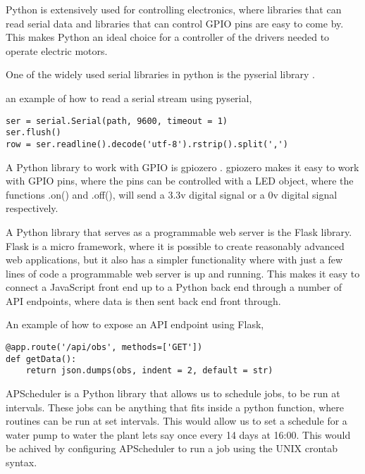 \documentclass[a4paper,12pt,twoside,openright,titlepage]{book}
\begin{document}
Python is extensively used for controlling electronics, where libraries that can read serial data and libraries that can control GPIO pins are easy to come by. This makes Python an ideal choice for a controller of the drivers needed to operate electric motors.

\bigskip

One of the widely used serial libraries in python is the pyserial library \cite{pyserial}.

an example of how to read a serial stream using pyserial,

\begin{verbatim}
ser = serial.Serial(path, 9600, timeout = 1)
ser.flush()
row = ser.readline().decode('utf-8').rstrip().split(',')
\end{verbatim}

\bigskip

A Python library to work with GPIO is gpiozero \cite{gpiozero}.
gpiozero makes it easy to work with GPIO pins, where the pins can be controlled with a LED object, where the functions .on() and .off(), will send a 3.3v digital signal or a 0v digital signal respectively.

\bigskip

A Python library that serves as a programmable web server is the Flask library. Flask is a micro framework, where it is possible to create reasonably advanced web applications, but it also has a simpler functionality where with just a few lines of code a programmable web server is up and running.
This makes it easy to connect a JavaScript front end up to a Python back end through a number of API endpoints, where data is then sent back end front through.

An example of how to expose an API endpoint using Flask,
\begin{verbatim}
@app.route('/api/obs', methods=['GET'])
def getData():
    return json.dumps(obs, indent = 2, default = str)
\end{verbatim}

\bigskip

APScheduler is a Python library that allows us to schedule jobs, to be run at intervals. These jobs can be anything that fits inside a python function, where routines can be run at set intervals. This would allow us to set a schedule for a water pump to water the plant lets say once every 14 days at 16:00.
This would be achived by configuring APScheduler to run a job using the UNIX crontab syntax.

\newpage
\end{document}
